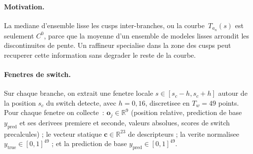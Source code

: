 \documentclass[11pt,a4paper]{article}
\newcommand{\R}{\mathbb{R}}
\newcommand{\Ta}{T_a}
\begin{document}
\paragraph{Motivation.} La mediane d'ensemble lisse les cusps
inter-branches, ou la courbe~$\Ta_n(s)$ est seulement $C^0$, parce
que la moyenne d'un ensemble de modeles lisses arrondit les
discontinuites de pente. Un raffineur specialise dans la zone des
cusps peut recuperer cette information sans degrader le reste de
la courbe.

\paragraph{Fenetres de switch.} Sur chaque branche, on extrait
une fenetre locale $s\!\in\![s_c\!-\!h,s_c\!+\!h]$ autour de la
position $s_c$ du switch detecte, avec $h\!=\!0{,}16$,
discretisee en $T_w\!=\!49$ points. Pour chaque fenetre on
collecte~:
$\mathbf{o}_j\!\in\!\R^9$ (position relative, prediction de base
$y_\text{pred}$ et ses derivees premiere et seconde, valeurs
absolues, scores de switch precalcules) ; le vecteur statique
$\mathbf{c}\!\in\!\R^{23}$ de descripteurs ; la verite normalisee
$y_\text{true}\!\in\![0,1]^{49}$ ; et la prediction de base
$y_\text{pred}\!\in\![0,1]^{49}$.
\end{document}

